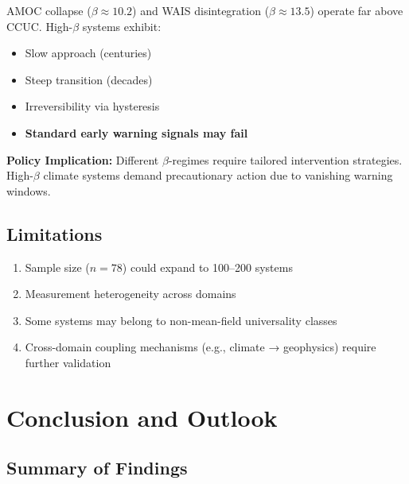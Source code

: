 \documentclass[11pt,a4paper]{article}
\begin{document}
AMOC collapse ($\beta \approx 10.2$) and WAIS disintegration ($\beta \approx 13.5$) operate far above CCUC. High-$\beta$ systems exhibit:

\begin{itemize}
\item Slow approach (centuries)
\item Steep transition (decades)
\item Irreversibility via hysteresis
\item \textbf{Standard early warning signals may fail} \cite{Lenton2011}
\end{itemize}

\textbf{Policy Implication:} Different $\beta$-regimes require tailored intervention strategies. High-$\beta$ climate systems demand precautionary action due to vanishing warning windows.

\subsection{Limitations}

\begin{enumerate}
\item Sample size ($n = 78$) could expand to 100--200 systems
\item Measurement heterogeneity across domains
\item Some systems may belong to non-mean-field universality classes
\item Cross-domain coupling mechanisms (e.g., climate → geophysics) require further validation
\end{enumerate}

\section{Conclusion and Outlook}
\label{sec:conclusion}

\subsection{Summary of Findings}
\end{document}
